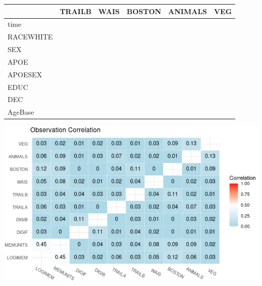 \documentclass[
]{article}
\begin{document}
\begin{longtable}[t]{l|l|l|l|l|l}
\hline
  & TRAILB & WAIS & BOSTON & ANIMALS & VEG\\
\hline
time & \cellcolor{red}{-0.46 (-0.65, -0.25)} & \cellcolor{red}{-0.19 (-0.34, -0.02)} & \cellcolor{white}{-0.06 (-0.28, 0.12)} & \cellcolor{red}{-0.20 (-0.37, -0.02)} & \cellcolor{white}{-0.13 (-0.32, 0.05)}\\
\hline
RACEWHITE & \cellcolor{white}{-0.06 (-0.24, 0.11)} & \cellcolor{red}{-0.24 (-0.36, -0.11)} & \cellcolor{white}{-0.13 (-0.28, 0.02)} & \cellcolor{red}{-0.31 (-0.45, -0.18)} & \cellcolor{red}{-0.30 (-0.44, -0.15)}\\
\hline
SEX & \cellcolor{white}{0.06 (-0.07, 0.19)} & \cellcolor{white}{0.02 (-0.08, 0.12)} & \cellcolor{red}{-0.16 (-0.28, -0.03)} & \cellcolor{white}{-0.08 (-0.20, 0.03)} & \cellcolor{red}{-0.16 (-0.27, -0.05)}\\
\hline
APOE & \cellcolor{white}{-0.05 (-0.23, 0.12)} & \cellcolor{white}{-0.02 (-0.16, 0.10)} & \cellcolor{white}{-0.05 (-0.22, 0.13)} & \cellcolor{white}{-0.11 (-0.27, 0.05)} & \cellcolor{white}{-0.13 (-0.30, 0.03)}\\
\hline
APOESEX & \cellcolor{white}{-0.18 (-0.40, 0.05)} & \cellcolor{white}{-0.15 (-0.31, 0.03)} & \cellcolor{white}{0.04 (-0.19, 0.25)} & \cellcolor{white}{-0.04 (-0.24, 0.17)} & \cellcolor{white}{0.04 (-0.16, 0.25)}\\
\hline
EDUC & \cellcolor{white}{-0.00 (-0.01, 0.00)} & \cellcolor{red}{-0.01 (-0.01, -0.00)} & \cellcolor{white}{-0.00 (-0.01, 0.01)} & \cellcolor{white}{0.00 (-0.01, 0.01)} & \cellcolor{white}{-0.00 (-0.01, 0.00)}\\
\hline
DEC & \cellcolor{red}{-0.27 (-0.41, -0.13)} & \cellcolor{red}{-0.31 (-0.42, -0.22)} & \cellcolor{red}{-0.33 (-0.45, -0.21)} & \cellcolor{red}{-0.14 (-0.26, -0.01)} & \cellcolor{red}{-0.20 (-0.33, -0.08)}\\
\hline
AgeBase & \cellcolor{red}{-0.01 (-0.02, -0.01)} & \cellcolor{red}{-0.01 (-0.02, -0.01)} & \cellcolor{red}{-0.01 (-0.02, -0.00)} & \cellcolor{red}{-0.01 (-0.02, -0.01)} & \cellcolor{red}{-0.01 (-0.02, -0.00)}\\
\hline
\end{longtable}
\endgroup{}

\includegraphics{img/NACCObsHeat.png}
\end{document}
